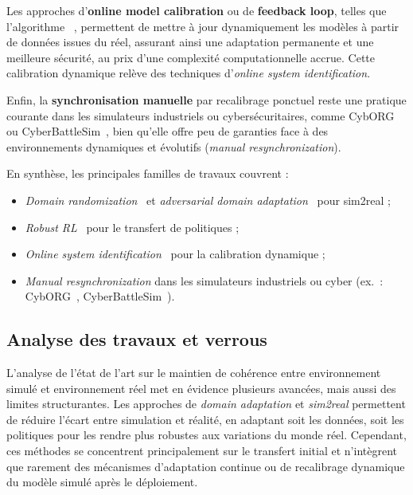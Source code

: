 Les approches d’\textbf{online model calibration} ou de \textbf{feedback loop}, telles que l’algorithme ~\cite{deisenroth2011pilco}, permettent de mettre à jour dynamiquement les modèles à partir de données issues du réel, assurant ainsi une adaptation permanente et une meilleure sécurité, au prix d’une complexité computationnelle accrue. Cette calibration dynamique relève des techniques d’\textit{online system identification}.

Enfin, la \textbf{synchronisation manuelle} par recalibrage ponctuel reste une pratique courante dans les simulateurs industriels ou cybersécuritaires, comme CybORG~\cite{Standen2021} ou CyberBattleSim~\cite{cyberbattlesim}, bien qu’elle offre peu de garanties face à des environnements dynamiques et évolutifs (\textit{manual resynchronization}).

\medskip

En synthèse, les principales familles de travaux couvrent :
\begin{itemize}
    \item \textit{Domain randomization}~\cite{tobin2017domain} et \textit{adversarial domain adaptation}~\cite{ganin2016domain} pour sim2real ;
    \item \textit{Robust RL}~\cite{pinto2017robust} pour le transfert de politiques ;
    \item \textit{Online system identification}~\cite{deisenroth2011pilco} pour la calibration dynamique ;
    \item \textit{Manual resynchronization} dans les simulateurs industriels ou cyber (ex.~: CybORG~\cite{Standen2021}, CyberBattleSim~\cite{cyberbattlesim}).
\end{itemize}


\subsection*{Analyse des travaux et verrous}

L’analyse de l’état de l’art sur le maintien de cohérence entre environnement simulé et environnement réel met en évidence plusieurs avancées, mais aussi des limites structurantes. Les approches de \textit{domain adaptation} et \textit{sim2real} permettent de réduire l’écart entre simulation et réalité, en adaptant soit les données, soit les politiques pour les rendre plus robustes aux variations du monde réel. Cependant, ces méthodes se concentrent principalement sur le transfert initial et n’intègrent que rarement des mécanismes d’adaptation continue ou de recalibrage dynamique du modèle simulé après le déploiement.

